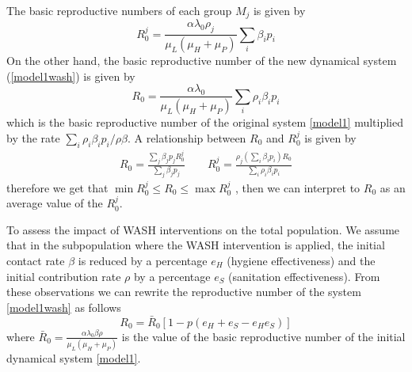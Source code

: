 \documentclass[12pt,a4paper]{article}
\theoremstyle{plain}%
\theoremstyle{definition}
\theoremstyle{remark}
\begin{document}
	The basic reproductive numbers of each group $M_j$ is given by
	\begin{equation}
	R_{0}^j=\frac{ \alpha \lambda_0 \rho_j}{\mu_L(\mu_{H}+\mu_P)} \sum_i\beta_i p_i 
	\end{equation}
	On the other hand, the basic reproductive number of the new dynamical system (\ref{model1wash}) is given by
	\begin{equation}
	R_0=\frac{ \alpha \lambda_0 }{ \mu_L (\mu_H+\mu_P)} \sum_i \rho_i \beta_i p_i 
	\end{equation}
	which is the basic reproductive number of the original system \eqref{model1} multiplied by the rate $\sum_i \rho_i \beta_i p_i/\rho\beta$.
	A relationship between $R_0$ and $R_0^j$ is given by
	\begin{equation}
	\begin{split}
		R_{0}=\frac{\sum_j \beta_{j} p_j R_0^j}
	{\sum_j \beta_{j} p_j}   
	\qquad
	R_{0}^j=\frac{ \rho_j (\sum_i \beta_{i} p_i) R_0}
	{\sum_i \rho_i \beta_{i} p_i}
	\end{split}
	\end{equation}
	therefore we get that $\min R_0^j\leq R_0 \leq \max R_0^j$
	, then we can interpret to $R_0$ as an average value of the $R_0^j$.
	
	To assess the impact of WASH interventions on the total population.
	We assume that in the subpopulation where the WASH intervention is applied, the initial contact rate $\beta$ is reduced by a percentage $e_H$ (hygiene effectiveness) and the initial contribution rate $\rho$ by a percentage $e_S$ (sanitation effectiveness).
	From these observations we can rewrite the reproductive number of the system \ref{model1wash} as follows
	\begin{equation}\label{R0model1caso3}
	R_0=\bar R_0  \left[ 1- p(e_H+e_{S}-e_H e_{S})\right] 
	\end{equation}
	where $\bar R_0=\frac{\alpha \lambda_0 \beta \rho}{ \mu_L (\mu_H+\mu_P)}$ is the value of the basic reproductive number of the initial dynamical system \ref{model1}.
	
\end{document}
